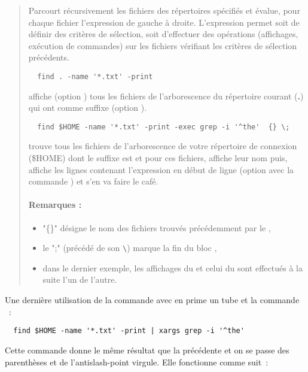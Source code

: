 \documentclass[a4paper,11pt]{article}
\begin{document}
\begin{quote}
  Parcourt récursivement les fichiers des répertoires spécifiés et évalue,
  pour chaque fichier l'expression de gauche à droite.  L'expression permet
  soit de définir des critères de sélection, soit d'effectuer des opérations
  (affichages, exécution de commandes) sur les fichiers vérifiant les critères
  de sélection précédents.

\begin{verbatim}
  find . -name '*.txt' -print
\end{verbatim}
affiche (option ) tous les fichiers de l'arborescence du répertoire
courant (\textbf{.}) qui ont comme suffixe  (option ). 

\begin{verbatim}
  find $HOME -name '*.txt' -print -exec grep -i '^the'  {} \;
\end{verbatim}
trouve tous les fichiers de l'arborescence de votre répertoire de connexion
(\$HOME) dont le suffixe est  et pour ces fichiers, affiche leur
nom puis, affiche les lignes contenant l'expression  en début de
ligne (option  avec la commande ) et s'en va
faire le café.

\paragraph{Remarques :}

\begin{itemize}
  \item "\{\}" désigne le nom des fichiers trouvés précédemment par le
        ,
  \item le ";" (précédé de son \verb+\+) marque la fin du bloc ,
  \item dans le dernier exemple, les affichages du  et celui du
         sont effectués à la suite l'un de l'autre.
\end{itemize}
\end{quote}

Une dernière utilisation de la commande  avec en prime un tube et la
commande  :

\begin{verbatim}
  find $HOME -name '*.txt' -print | xargs grep -i '^the'
\end{verbatim}

Cette commande donne le même résultat que la précédente et on se passe des
parenthèses et de l'antislash-point virgule. Elle fonctionne comme suit :
\end{document}
